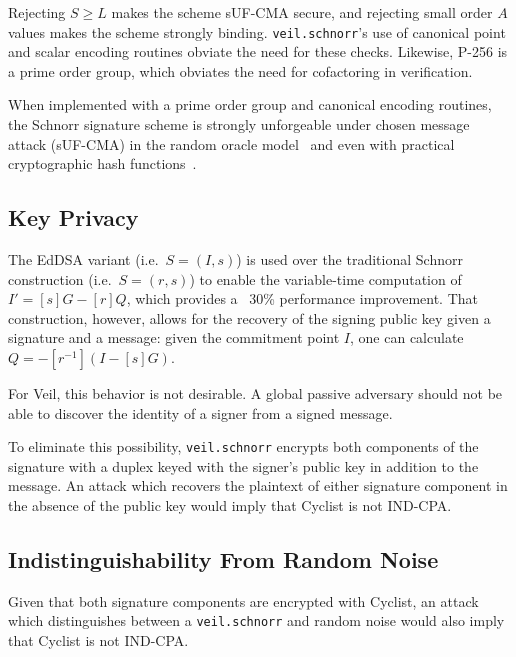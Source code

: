 Rejecting $S \geq L$ makes the scheme sUF-CMA secure, and rejecting small order $A$ values makes the scheme strongly
binding.
\texttt{veil.schnorr}'s use of canonical point and scalar encoding routines obviate the need for these checks.
Likewise, P-256 is a prime order group, which obviates the need for cofactoring in verification.

When implemented with a prime order group and canonical encoding routines, the Schnorr signature scheme is strongly
unforgeable under chosen message attack (sUF-CMA) in the random oracle model~\cite{pointcheval2000} and even with
practical cryptographic hash functions~\cite{neven2009}.

\subsection{Key Privacy}\label{subsec:veil.schnorr-key-privacy}

The EdDSA variant (i.e.\ $S=(I,s)$) is used over the traditional Schnorr construction (i.e.\ $S=(r,s)$) to enable the
variable-time computation of $I'=[s]G - [r]Q$, which provides a ~30\% performance improvement.
That construction, however, allows for the recovery of the signing public key given a signature and a message: given the
commitment point $I$, one can calculate $Q=-[r^{-1}](I - [s]G)$.

For Veil, this behavior is not desirable.
A global passive adversary should not be able to discover the identity of a signer from a signed message.

To eliminate this possibility, \texttt{veil.schnorr} encrypts both components of the signature with a duplex keyed with
the signer's public key in addition to the message.
An attack which recovers the plaintext of either signature component in the absence of the public key would imply that
Cyclist is not IND-CPA\@.

\subsection{Indistinguishability From Random Noise}\label{subsec:veil.schnorr-indistinguishability}

Given that both signature components are encrypted with Cyclist, an attack which distinguishes between a
\texttt{veil.schnorr} and random noise would also imply that Cyclist is not IND-CPA\@.
